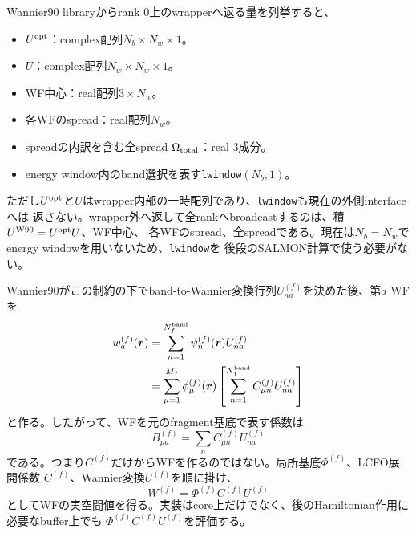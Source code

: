 \documentclass[11pt,a4paper]{article}
\newcommand{\code}[1]{\texttt{#1}}
\begin{document}
Wannier90 libraryからrank 0上のwrapperへ返る量を列挙すると、
\begin{itemize}
\item $U^{\rm opt}$：complex配列$N_b\times N_w\times1$。
\item $U$：complex配列$N_w\times N_w\times1$。
\item WF中心：real配列$3\times N_w$。
\item 各WFのspread：real配列$N_w$。
\item spreadの内訳を含む全spread $\Omega_{\rm total}$：real 3成分。
\item energy window内のband選択を表す\code{lwindow}$(N_b,1)$。
\end{itemize}
ただし$U^{\rm opt}$と$U$はwrapper内部の一時配列であり、\code{lwindow}も現在の外側interfaceへは
返さない。wrapper外へ返して全rankへbroadcastするのは、積$U^{\rm W90}=U^{\rm opt}U$、WF中心、
各WFのspread、全spreadである。現在は$N_b=N_w$でenergy windowを用いないため、\code{lwindow}を
後段のSALMON計算で使う必要がない。

Wannier90がこの制約の下でband-to-Wannier変換行列$U_{na}^{(f)}$を決めた後、第$a$ WFを
\begin{align}
 w_a^{(f)}(\boldsymbol r)
 &=\sum_{n=1}^{N_f^{\rm band}}\psi_n^{(f)}(\boldsymbol r)U_{na}^{(f)} \notag\\
 &=\sum_{\mu=1}^{M_f}\phi_\mu^{(f)}(\boldsymbol r)
 \left[\sum_{n=1}^{N_f^{\rm band}}C_{\mu n}^{(f)}U_{na}^{(f)}\right]
 \label{eq:fragment-wannier-reconstruction}
\end{align}
と作る。したがって、WFを元のfragment基底で表す係数は
\begin{equation}
 B_{\mu a}^{(f)}=\sum_n C_{\mu n}^{(f)}U_{na}^{(f)}
 \label{eq:fragment-wannier-coefficient}
\end{equation}
である。つまり$C^{(f)}$だけからWFを作るのではない。局所基底$\Phi^{(f)}$、LCFO展開係数
$C^{(f)}$、Wannier変換$U^{(f)}$を順に掛け、
\begin{equation}
 W^{(f)}=\Phi^{(f)}C^{(f)}U^{(f)}
 \label{eq:fragment-wannier-matrix-product}
\end{equation}
としてWFの実空間値を得る。実装はcore上だけでなく、後のHamiltonian作用に必要なbuffer上でも
$\Phi^{(f)}C^{(f)}U^{(f)}$を評価する。
\end{document}
